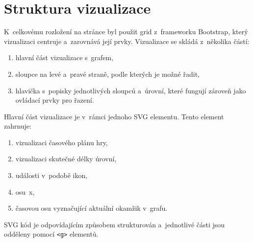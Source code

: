 \documentclass[
  digital, %
  oneside, %
  table,   %
  nolof,     %
  nolot,     %
  nocover
]{fithesis3}
\begin{document}
\section{Struktura vizualizace} \label{chartStructure}
K~celkovému rozložení na stránce byl použit grid z~frameworku Bootstrap, který vizualizaci centruje a~zarovnává její prvky. Vizualizace se skládá z~několika částí:
\begin{enumerate}
  \item hlavní část vizualizace s~grafem,
  \item sloupce na levé a~pravé straně, podle kterých je možné řadit,
  \item hlavička s~popisky jednotlivých sloupců a~úrovní, které fungují zároveň jako ovládací prvky pro řazení.
\end{enumerate}
Hlavní část vizualizace je v~rámci jednoho SVG elementu. Tento element zahrnuje:
\begin{enumerate}
  \item vizualizaci časového plánu hry,
  \item vizualizaci skutečné délky úrovní,
  \item události v~podobě ikon,
  \item osu~x,
  \item časovou osu vyznačující aktuální okamžik v~grafu.
\end{enumerate}
SVG kód je odpovídajícím způsobem strukturován a~jednotlivé části jsou odděleny pomocí \verb|<g>| elementů.
\end{document}
